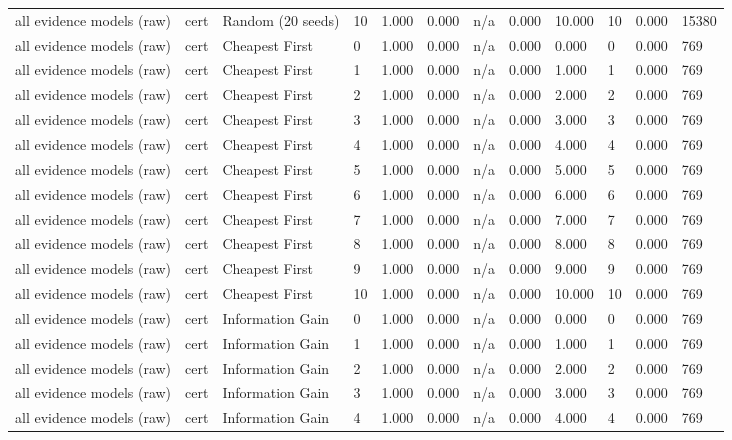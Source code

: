 \begin{table}[!ht]
{\begin{tabular}{llllllllllll}
all evidence models (raw) & cert & Random (20 seeds) & 10 & 1.000 & 0.000 & n/a & 0.000 & 10.000 & 10 & 0.000 & 15380 \\
all evidence models (raw) & cert & Cheapest First & 0 & 1.000 & 0.000 & n/a & 0.000 & 0.000 & 0 & 0.000 & 769 \\
all evidence models (raw) & cert & Cheapest First & 1 & 1.000 & 0.000 & n/a & 0.000 & 1.000 & 1 & 0.000 & 769 \\
all evidence models (raw) & cert & Cheapest First & 2 & 1.000 & 0.000 & n/a & 0.000 & 2.000 & 2 & 0.000 & 769 \\
all evidence models (raw) & cert & Cheapest First & 3 & 1.000 & 0.000 & n/a & 0.000 & 3.000 & 3 & 0.000 & 769 \\
all evidence models (raw) & cert & Cheapest First & 4 & 1.000 & 0.000 & n/a & 0.000 & 4.000 & 4 & 0.000 & 769 \\
all evidence models (raw) & cert & Cheapest First & 5 & 1.000 & 0.000 & n/a & 0.000 & 5.000 & 5 & 0.000 & 769 \\
all evidence models (raw) & cert & Cheapest First & 6 & 1.000 & 0.000 & n/a & 0.000 & 6.000 & 6 & 0.000 & 769 \\
all evidence models (raw) & cert & Cheapest First & 7 & 1.000 & 0.000 & n/a & 0.000 & 7.000 & 7 & 0.000 & 769 \\
all evidence models (raw) & cert & Cheapest First & 8 & 1.000 & 0.000 & n/a & 0.000 & 8.000 & 8 & 0.000 & 769 \\
all evidence models (raw) & cert & Cheapest First & 9 & 1.000 & 0.000 & n/a & 0.000 & 9.000 & 9 & 0.000 & 769 \\
all evidence models (raw) & cert & Cheapest First & 10 & 1.000 & 0.000 & n/a & 0.000 & 10.000 & 10 & 0.000 & 769 \\
all evidence models (raw) & cert & Information Gain & 0 & 1.000 & 0.000 & n/a & 0.000 & 0.000 & 0 & 0.000 & 769 \\
all evidence models (raw) & cert & Information Gain & 1 & 1.000 & 0.000 & n/a & 0.000 & 1.000 & 1 & 0.000 & 769 \\
all evidence models (raw) & cert & Information Gain & 2 & 1.000 & 0.000 & n/a & 0.000 & 2.000 & 2 & 0.000 & 769 \\
all evidence models (raw) & cert & Information Gain & 3 & 1.000 & 0.000 & n/a & 0.000 & 3.000 & 3 & 0.000 & 769 \\
all evidence models (raw) & cert & Information Gain & 4 & 1.000 & 0.000 & n/a & 0.000 & 4.000 & 4 & 0.000 & 769 \\

\end{tabular}}
\end{table}
